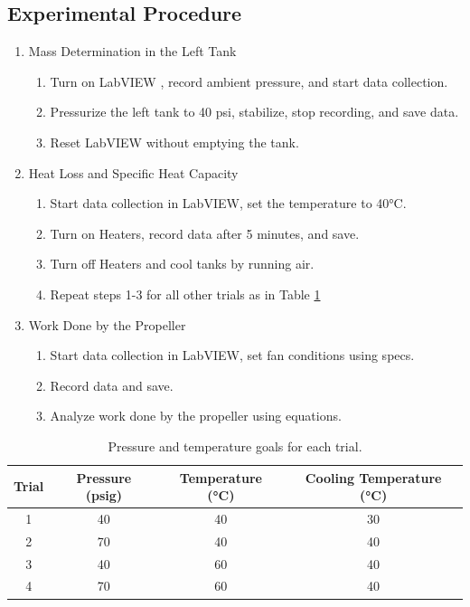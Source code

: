 \documentclass[12pt]{article}
\begin{document}
\subsection*{Experimental Procedure}
\begin{enumerate}
    \item Mass Determination in the Left Tank \autocite{che}
    \begin{enumerate}
        \item Turn on LabVIEW \autocite{che}, record ambient pressure, and start data collection.
        \item Pressurize the left tank to 40 psi, stabilize, stop recording, and save data.
        \item Reset LabVIEW without emptying the tank.
    \end{enumerate}
    \item Heat Loss and Specific Heat Capacity \autocite{che}
    \begin{enumerate}
        \item Start data collection in LabVIEW, set the temperature to 40°C.
        \item Turn on Heaters, record data after 5 minutes, and save.
        \item Turn off Heaters and cool tanks by running air.
        \item Repeat steps 1-3 for all other trials as in Table \ref{table:procedure}
    \end{enumerate}
    \item Work Done by the Propeller \autocite{che}
    \begin{enumerate}
        \item Start data collection in LabVIEW, set fan conditions using specs.
        \item Record data and save.
        \item Analyze work done by the propeller using equations.
    \end{enumerate}
\end{enumerate}
\begin{table}[h]
  \centering
  \begin{tabular}{|c|c|c|c|}
    \hline
    Trial & Pressure (psig) & Temperature (°C) & Cooling Temperature (°C) \\
    \hline
    1 & 40& 40& 30\\
    2 & 70& 40& 40\\
    3 & 40& 60& 40\\
    4 & 70& 60& 40\\
    \hline
  \end{tabular}
  \caption{Pressure and temperature goals for each trial.}
  \label{table:procedure}
\end{table}
\end{document}
